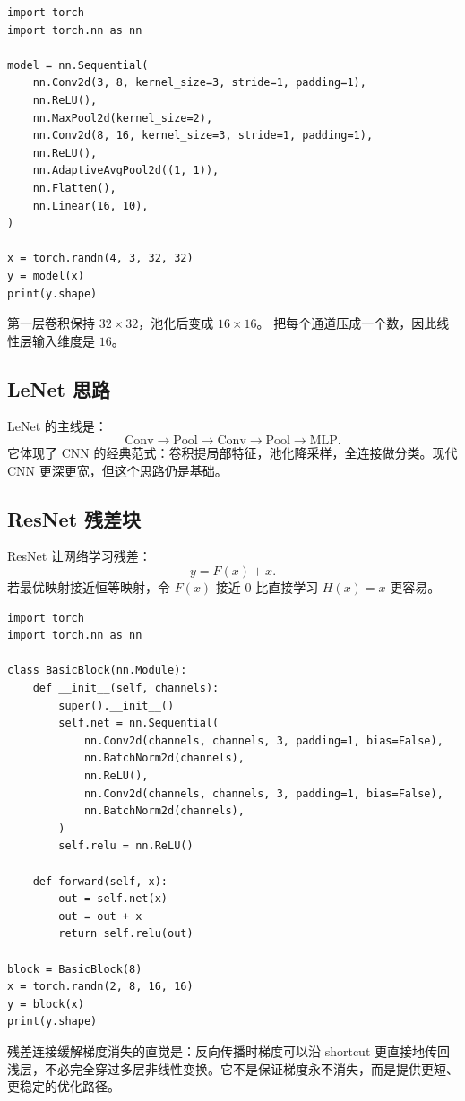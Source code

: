 \begin{lstlisting}
import torch
import torch.nn as nn

model = nn.Sequential(
    nn.Conv2d(3, 8, kernel_size=3, stride=1, padding=1),
    nn.ReLU(),
    nn.MaxPool2d(kernel_size=2),
    nn.Conv2d(8, 16, kernel_size=3, stride=1, padding=1),
    nn.ReLU(),
    nn.AdaptiveAvgPool2d((1, 1)),
    nn.Flatten(),
    nn.Linear(16, 10),
)

x = torch.randn(4, 3, 32, 32)
y = model(x)
print(y.shape)
\end{lstlisting}

第一层卷积保持 \(32\times 32\)，池化后变成 \(16\times 16\)。 把每个通道压成一个数，因此线性层输入维度是 \(16\)。

\subsection{LeNet 思路}

LeNet 的主线是：
\[
\mathrm{Conv} \rightarrow \mathrm{Pool} \rightarrow \mathrm{Conv} \rightarrow \mathrm{Pool} \rightarrow \mathrm{MLP}.
\]
它体现了 CNN 的经典范式：卷积提局部特征，池化降采样，全连接做分类。现代 CNN 更深更宽，但这个思路仍是基础。

\subsection{ResNet 残差块}

ResNet 让网络学习残差：
\[
y=F(x)+x.
\]
若最优映射接近恒等映射，令 \(F(x)\) 接近 \(0\) 比直接学习 \(H(x)=x\) 更容易。

\begin{lstlisting}
import torch
import torch.nn as nn

class BasicBlock(nn.Module):
    def __init__(self, channels):
        super().__init__()
        self.net = nn.Sequential(
            nn.Conv2d(channels, channels, 3, padding=1, bias=False),
            nn.BatchNorm2d(channels),
            nn.ReLU(),
            nn.Conv2d(channels, channels, 3, padding=1, bias=False),
            nn.BatchNorm2d(channels),
        )
        self.relu = nn.ReLU()

    def forward(self, x):
        out = self.net(x)
        out = out + x
        return self.relu(out)

block = BasicBlock(8)
x = torch.randn(2, 8, 16, 16)
y = block(x)
print(y.shape)
\end{lstlisting}

残差连接缓解梯度消失的直觉是：反向传播时梯度可以沿 shortcut 更直接地传回浅层，不必完全穿过多层非线性变换。它不是保证梯度永不消失，而是提供更短、更稳定的优化路径。

